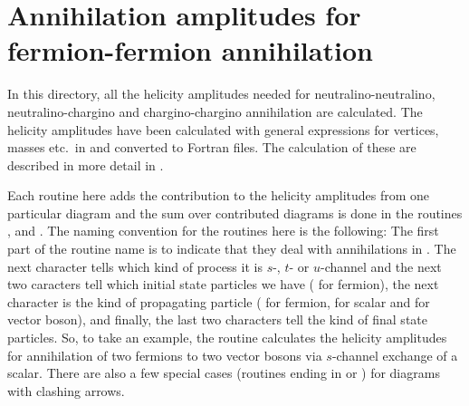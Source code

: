 
\section{Annihilation amplitudes for fermion-fermion annihilation}

In this directory, all the helicity amplitudes needed for
neutralino-neutralino, neutralino-chargino and chargino-chargino
annihilation are calculated. The helicity amplitudes have been
calculated with general expressions for vertices, masses etc.\ in
 and converted to Fortran files. The calculation of these
are described in more detail in \cite{edsjo97}.

Each routine here adds the contribution to the helicity amplitudes
from one particular diagram and the sum over contributed diagrams is
done in the routines , 
and . The naming convention for the routines
here is the following: The first part of the routine name is
 to indicate that they deal with annihilations in \ds. The
next character tells which kind of process it is $s$-, $t$- or
$u$-channel and the next two caracters tell which initial state
particles we have ( for fermion), the next character is the
kind of propagating particle ( for fermion,  for
scalar and  for vector boson), and finally, the last two
characters tell the kind of final state particles. So, to take an
example, the routine  calculates the helicity
amplitudes for annihilation of two fermions to two vector
bosons via $s$-channel exchange of a scalar. There are also a few
special cases (routines ending in  or ) for
diagrams with clashing arrows.
